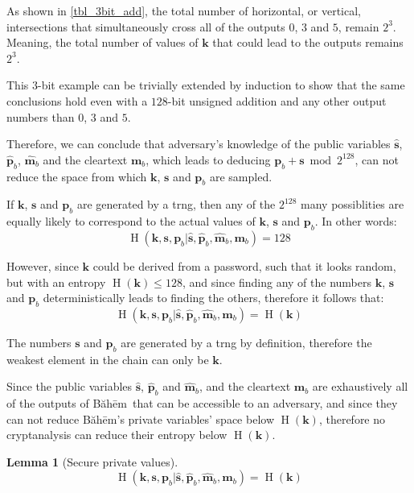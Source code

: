 \documentclass[twocolumn,hidelinks]{article}
\newcommand{\baheem}{Băhēm}
\DeclareMathOperator{\entropy}{H}
\newtheorem{lemma}{Lemma}
\begin{document}
As shown in \cref{tbl_3bit_add}, the total number of horizontal, or
vertical, intersections that simultaneously cross all of the outputs $0$,
$3$ and $5$, remain $2^3$.  Meaning, the total number of values of
$\mathbf{k}$ that could lead to the outputs remains $2^3$.

This $3$-bit example can be trivially extended by induction to show that
the same conclusions hold even with a $128$-bit unsigned addition and any
other output numbers than $0$, $3$ and $5$.

Therefore, we can conclude that adversary's knowledge of the public
variables $\mathbf{\hat s}$, $\mathbf{\hat p}_b$, $\mathbf{\hat m}_b$ and
the cleartext $\mathbf{m}_b$, which leads to deducing $\mathbf{p}_b +
\mathbf{s} \bmod{2^{128}}$, can not reduce the space from which
$\mathbf{k}$, $\mathbf{s}$ and $\mathbf{p}_b$ are sampled.

If $\mathbf{k}$, $\mathbf{s}$ and $\mathbf{p}_b$ are generated by a
\gls{trng}, then any of the $2^{128}$ many possiblities are equally likely
to correspond to the actual values of $\mathbf{k}$, $\mathbf{s}$ and
$\mathbf{p}_b$.  In other words:
\[
    \entropy(\mathbf{k},\mathbf{s},\mathbf{p}_b
        | \mathbf{\hat s},
          \mathbf{\hat p}_b,
          \mathbf{\hat m}_b,
          \mathbf{m}_b
    )
    = 128
\]

However, since $\mathbf{k}$ could be derived from a password, such that it
looks random, but with an entropy $\entropy(\mathbf{k}) \le 128$, and since
finding any of the numbers $\mathbf{k}$, $\mathbf{s}$ and $\mathbf{p}_b$
deterministically leads to finding the others, therefore it follows that:
\[
    \entropy(\mathbf{k},\mathbf{s},\mathbf{p}_b
        | \mathbf{\hat s},
          \mathbf{\hat p}_b,
          \mathbf{\hat m}_b,
          \mathbf{m}_b
    )
    = \entropy(\mathbf{k})
\]

The numbers $\mathbf{s}$ and $\mathbf{p}_b$ are generated by a \gls{trng}
by definition, therefore the weakest element in the chain can only be
$\mathbf{k}$.

Since the public variables $\mathbf{\hat s}$, $\mathbf{\hat p}_b$ and
$\mathbf{\hat m}_b$, and the cleartext $\mathbf{m}_b$ are exhaustively all
of the outputs of \baheem\ that can be accessible to an adversary, and
since they can not reduce \baheem's private variables' space below
$\entropy(\mathbf{k})$, therefore no cryptanalysis can reduce their entropy
below $\entropy(\mathbf{k})$.

\begin{lemma}[Secure private values]
    \[
        \entropy(\mathbf{k},\mathbf{s},\mathbf{p}_b
            | \mathbf{\hat s},
              \mathbf{\hat p}_b,
              \mathbf{\hat m}_b,
              \mathbf{m}_b
        )
        = \entropy(\mathbf{k})
    \]
    \label{thrm_baheem_secure_private_values}
\end{lemma}
\end{document}
